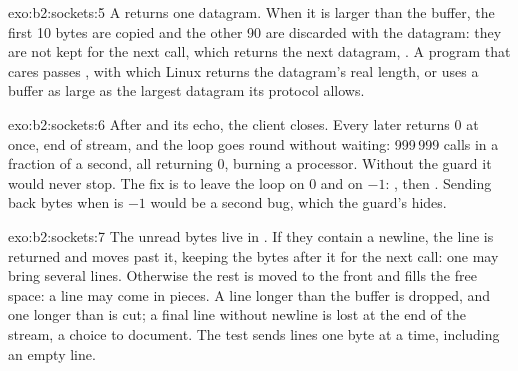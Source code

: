 \begin{solution}{exo:b2:sockets:5}
A  returns one datagram. When it is larger than the buffer, the first 10 bytes are copied and the other
90 are discarded with the datagram: they are not kept for the next call, which returns the next datagram,
. A program that cares passes , with which Linux returns the datagram's real length, or
uses a buffer as large as the largest datagram its protocol allows.
\end{solution}

\begin{solution}{exo:b2:sockets:6}
After  and its echo, the client closes. Every later  returns 0 at once, end of stream, and the loop goes
round without waiting: 999\,999 calls in a fraction of a second, all returning 0, burning a processor. Without the
guard it would never stop. The fix is to leave the loop on 0 and on $-1$: , then . Sending back  bytes when  is $-1$ would be a
second bug, which the guard's  hides.
\end{solution}

\begin{solution}{exo:b2:sockets:7}
The unread bytes live in \code{buf[start..end)}. If they contain a newline, the line is returned and 
moves past it, keeping the bytes after it for the next call: one  may bring several lines. Otherwise the
rest is moved to the front and  fills the free space: a line may come in pieces. A line longer than the
buffer is dropped, and one longer than  is cut; a final line without newline is lost at the end of the
stream, a choice to document. The test sends lines one byte at a time, including an empty line.
\end{solution}

